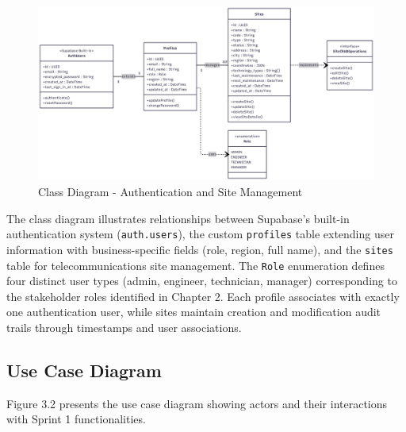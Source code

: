 \begin{figure}[H]
    \centering
    \includegraphics[width=0.95\linewidth]{img/chap_03/class_diagram_sprint1.png}
    \caption{Class Diagram - Authentication and Site Management}
    \label{fig:class_diagram_sprint1}
\end{figure}


The class diagram illustrates relationships between Supabase's built-in authentication system (\texttt{auth.users}), the custom \texttt{profiles} table extending user information with business-specific fields (role, region, full name), and the \texttt{sites} table for telecommunications site management. The \texttt{Role} enumeration defines four distinct user types (admin, engineer, technician, manager) corresponding to the stakeholder roles identified in Chapter 2. Each profile associates with exactly one authentication user, while sites maintain creation and modification audit trails through timestamps and user associations.

\subsection{Use Case Diagram}

Figure 3.2 presents the use case diagram showing actors and their interactions with Sprint 1 functionalities.


